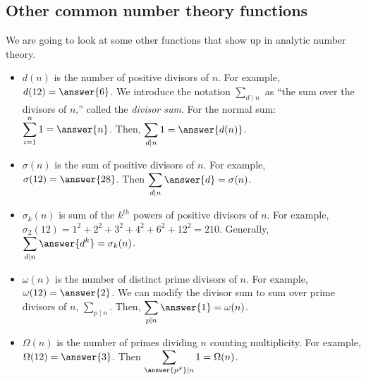 \documentclass{ximera}
\begin{document}
\subsection{Other common number theory functions}
We are going to look at some other functions that show up in analytic number theory. 
\begin{itemize}
 \item $d(n)$ is the number of positive divisors of $n$. For example, $d(12)=\answer{6}$. We introduce the notation $\displaystyle\sum_{d\mid n}$ as ``the sum over the divisors of $n$,'' called the \emph{divisor sum}. For the normal sum: $\displaystyle\sum_{i=1}^n 1=\answer{n}$. Then, $\displaystyle\sum_{d\mid n}1=\answer{d(n)}$.
 
 \item $\sigma(n)$ is the sum of positive divisors of $n$. For example, $\sigma(12)=\answer{28}$. Then $\displaystyle\sum_{d\mid n}\answer{d}=\sigma(n)$.
 
 \item $\sigma_k(n)$ is sum of the $k^{th}$ powers of positive divisors of $n$. For example, $\sigma_2(12)=1^2+2^2+3^2+4^2+6^2+12^2=210.$ Generally, $\displaystyle\sum_{d\mid n}\answer{d^k}=\sigma_k(n)$.

 \item $\omega(n)$ is the number of distinct prime divisors of $n$. For example, $\omega(12)=\answer{2}$. We can modify the divisor sum to sum over prime divisors of $n$,  $\displaystyle\sum_{p\mid n}$. Then, $\displaystyle\sum_{p\mid n} \answer{1}=\omega(n)$.
 
 \item $\Omega(n)$ is the number of primes dividing $n$ counting multiplicity. For example, $\Omega(12)=\answer{3}$. Then $\displaystyle\sum_{\answer{p^\beta}\mid n} 1=\Omega(n)$.

\end{itemize}
\end{document}
